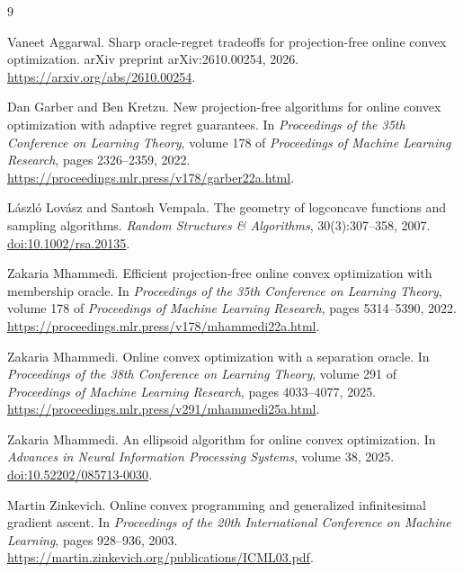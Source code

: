 \documentclass[11pt]{article}
\theoremstyle{definition}
\newcounter{algorithm}
\begin{document}
\begin{thebibliography}{9}

Vaneet Aggarwal.
\newblock Sharp oracle-regret tradeoffs for projection-free online convex optimization.
\newblock arXiv preprint arXiv:2610.00254, 2026.
\newblock \url{https://arxiv.org/abs/2610.00254}.

Dan Garber and Ben Kretzu.
\newblock New projection-free algorithms for online convex optimization with
adaptive regret guarantees.
\newblock In \emph{Proceedings of the 35th Conference on Learning Theory},
volume 178 of \emph{Proceedings of Machine Learning Research},
pages 2326--2359, 2022.
\newblock \url{https://proceedings.mlr.press/v178/garber22a.html}.

L\'aszl\'o Lov\'asz and Santosh Vempala.
\newblock The geometry of logconcave functions and sampling algorithms.
\newblock \emph{Random Structures \& Algorithms}, 30(3):307--358, 2007.
\newblock \href{https://doi.org/10.1002/rsa.20135}{doi:10.1002/rsa.20135}.

Zakaria Mhammedi.
\newblock Efficient projection-free online convex optimization with membership oracle.
\newblock In \emph{Proceedings of the 35th Conference on Learning Theory},
volume 178 of \emph{Proceedings of Machine Learning Research},
pages 5314--5390, 2022.
\newblock \url{https://proceedings.mlr.press/v178/mhammedi22a.html}.

Zakaria Mhammedi.
\newblock Online convex optimization with a separation oracle.
\newblock In \emph{Proceedings of the 38th Conference on Learning Theory},
volume 291 of \emph{Proceedings of Machine Learning Research},
pages 4033--4077, 2025.
\newblock \url{https://proceedings.mlr.press/v291/mhammedi25a.html}.

Zakaria Mhammedi.
\newblock An ellipsoid algorithm for online convex optimization.
\newblock In \emph{Advances in Neural Information Processing Systems},
volume 38, 2025.
\newblock \href{https://doi.org/10.52202/085713-0030}{doi:10.52202/085713-0030}.

Martin Zinkevich.
\newblock Online convex programming and generalized infinitesimal gradient ascent.
\newblock In \emph{Proceedings of the 20th International Conference on Machine
Learning}, pages 928--936, 2003.
\newblock \url{https://martin.zinkevich.org/publications/ICML03.pdf}.

\end{thebibliography}
\end{document}
